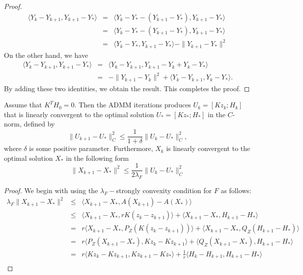 \begin{itemize}
\begin{proof}
\begin{eqnarray*}
\langle Y_{k} - Y_{k+1}, Y_{k+1} - Y_* \rangle &=& \langle Y_{k} - Y_* - (Y_{k+1} - Y_*), Y_{k+1} - Y_* \rangle \\ 
&=& \langle Y_{k} - Y_* - (Y_{k+1} - Y_*), Y_{k+1} - Y_* \rangle \\
&=&  \langle Y_{k} - Y_*, Y_{k+1} - Y_* \rangle - \| Y_{k+1} - Y_* \|^2
\end{eqnarray*} 
On the other hand, we have 
\begin{eqnarray*}
\langle Y_{k} - Y_{k+1}, Y_{k+1} - Y_* \rangle &=& \langle Y_{k} - Y_{k+1}, Y_{k+1} - Y_k + Y_k - Y_* \rangle \\ 
&=& - \|Y_{k+1} - Y_{k}\|^2 + \langle Y_{k} - Y_{k+1}, Y_k - Y_* \rangle . 
\end{eqnarray*} 
By adding these two identities, we obtain the result. This completes the proof. 
\end{proof}
\begin{theorem}
Assume that $K^TH_0 = 0$. Then the ADMM iterations produces $U_k = [Kz_k; H_k]$ that is linearly convergent to the optimal solution  $U_* = [Kz_*; H_*]$ in the $C$-norm, defined by 
\begin{equation}
\|U_{k+1} - U_* \|^2_C \leq \frac{1}{1+\delta} \|U_{k} - U_*\|^2_C,
\end{equation}
where $\delta$ is some positive parameter. Furthermore, $X_k$ is linearly convergent to the optimal solution $X_*$ in the following form
\begin{equation}
\|X_{k+1} - X_* \|^2 \leq \frac{1}{2 \lambda_F} \|U_{k} - U_* \|^2_C
\end{equation}
\end{theorem}
\begin{proof}
We begin with using the $\lambda_F-$strongly convexity condition for $F$ as follows: 
\begin{eqnarray*}
\lambda_F \| X_{k+1} - X_* \|^2 &\leq& \langle X_{k+1} - X_*, A(X_{k+1}) - A(X_*)\rangle \\
&\leq& \langle X_{k+1} - X_*, r K(z_k - z_{k+1}) \rangle + \langle X_{k+1} - X_*, H_{k+1} - H_* \rangle \\
&=& r \langle X_{k+1} - X_*, P_Z (K(z_k - z_{k+1}))  \rangle + \langle X_{k+1} - X_*, Q_Z(H_{k+1} - H_*) \rangle \\
&=& r \langle  P_Z (X_{k+1} - X_*) , Kz_k - Kz_{k+1}   \rangle + \langle Q_Z (X_{k+1} - X_*), H_{k+1} - H_* \rangle  \\
&=& r \langle Kz_k - Kz_{k+1}, Kz_{k+1} - Kz_*  \rangle + \frac{1}{r} \langle H_{k} - H_{k+1}, H_{k+1} - H_* \rangle \\

\end{eqnarray*}
\end{proof}
\end{itemize}
